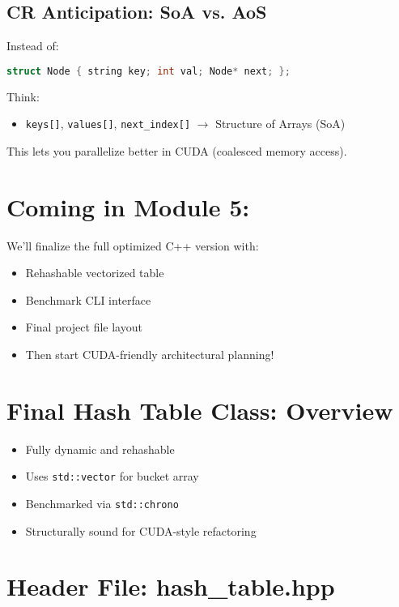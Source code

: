 \documentclass{article}
\begin{document}
\subsection*{CR Anticipation: SoA vs. AoS}

Instead of:
\begin{lstlisting}[language=C++]
struct Node { string key; int val; Node* next; };
\end{lstlisting}

Think:
\begin{itemize}
    \item \texttt{keys[]}, \texttt{values[]}, \texttt{next\_index[]} $\rightarrow$ Structure of Arrays (SoA)
\end{itemize}

This lets you parallelize better in CUDA (coalesced memory access).

\section*{Coming in Module 5:}

We’ll finalize the full optimized C++ version with:
\begin{itemize}
    \item Rehashable vectorized table
    \item Benchmark CLI interface
    \item Final project file layout
    \item Then start CUDA-friendly architectural planning!
\end{itemize}

\section*{Final Hash Table Class: Overview}

\begin{itemize}
    \item Fully dynamic and rehashable
    \item Uses \texttt{std::vector} for bucket array
    \item Benchmarked via \texttt{std::chrono}
    \item Structurally sound for CUDA-style refactoring
\end{itemize}

\section*{Header File: hash\_table.hpp}
\end{document}
